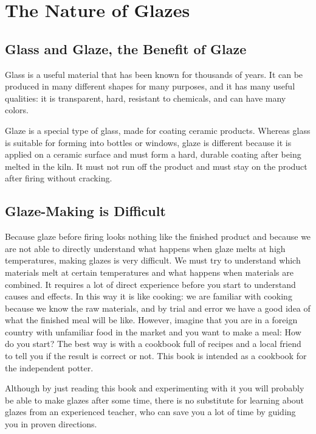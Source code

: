 \chapter{The Nature of Glazes}
\section{Glass and Glaze, the Benefit of Glaze}
Glass is a useful material that has been known for thousands of years. It can 
be produced in many different shapes for many purposes, and it has many useful 
qualities: it is transparent, hard, resistant to chemicals, and can have many 
colors.

Glaze is a special type of glass, made for coating ceramic products. Whereas 
glass is suitable for forming into bottles or windows, glaze is different 
because it is applied on a ceramic surface and must form a hard, durable 
coating after being melted in the kiln. It must not run off the product and 
must stay on the product after firing without cracking.
\section{Glaze-Making is Difficult}
Because glaze before firing looks nothing like the finished product and because 
we are not able to directly understand what happens when glaze melts at high 
temperatures, making glazes is very difficult. We must try to understand which 
materials melt at certain temperatures and what happens when materials are 
combined. It requires a lot of direct experience before you start to understand 
causes and effects. In this way it is like cooking: we are familiar with 
cooking because we know the raw materials, and by trial and error we have a 
good idea of what the finished meal will be like. However, imagine that you are 
in a foreign country with unfamiliar food in the market and you want to make a 
meal: How do you start? The best way is with a cookbook full of recipes and a 
local friend to tell you if the result is correct or not. This book is intended 
as a cookbook for the independent potter.

Although by just reading this book and experimenting with it you will probably 
be able to make glazes after some time, there is no substitute for learning 
about glazes from an experienced teacher, who can save you a lot of time by 
guiding you in proven directions.

